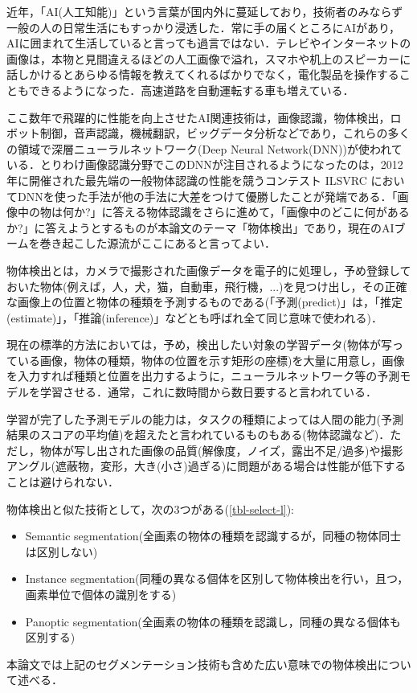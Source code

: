 \documentclass[originalpaper,fleqn]{jsaiart}     %
\begin{document}
近年，「AI(人工知能)」という言葉が国内外に蔓延しており，技術者のみならず一般の人の日常生活にもすっかり浸透した．常に手の届くところにAIがあり，AIに囲まれて生活していると言っても過言ではない．テレビやインターネットの画像は，本物と見間違えるほどの人工画像で溢れ，スマホや机上のスピーカーに話しかけるとあらゆる情報を教えてくれるばかりでなく，電化製品を操作することもできるようになった．高速道路を自動運転する車も増えている．

ここ数年で飛躍的に性能を向上させたAI関連技術は，画像認識，物体検出，ロボット制御，音声認識，機械翻訳，ビッグデータ分析などであり，これらの多くの領域で深層ニューラルネットワーク(Deep Neural Network(DNN))が使われている．とりわけ画像認識分野でこのDNNが注目されるようになったのは，2012年に開催された最先端の一般物体認識の性能を競うコンテスト ILSVRC においてDNNを使った手法が他の手法に大差をつけて優勝したことが発端である．「画像中の物は何か?」に答える物体認識をさらに進めて，「画像中のどこに何があるか?」に答えようとするものが本論文のテーマ「物体検出」であり，現在のAIブームを巻き起こした源流がここにあると言ってよい．

物体検出とは，カメラで撮影された画像データを電子的に処理し，予め登録しておいた物体(例えば，人，犬，猫，自動車，飛行機，...)を見つけ出し，その正確な画像上の位置と物体の種類を予測するものである(「予測(predict)」は，「推定(estimate)」，「推論(inference)」などとも呼ばれ全て同じ意味で使われる)．

現在の標準的方法においては，予め，検出したい対象の学習データ(物体が写っている画像，物体の種類，物体の位置を示す矩形の座標)を大量に用意し，画像を入力すれば種類と位置を出力するように，ニューラルネットワーク等の予測モデルを学習させる．通常，これに数時間から数日要すると言われている．

学習が完了した予測モデルの能力は，タスクの種類によっては人間の能力(予測結果のスコアの平均値)を超えたと言われているものもある(物体認識など)．ただし，物体が写し出された画像の品質(解像度，ノイズ，露出不足/過多)や撮影アングル(遮蔽物，変形，大き(小さ)過ぎる)に問題がある場合は性能が低下することは避けられない．

物体検出と似た技術として，次の3つがある(\ref{tbl-select-l}):

\begin{itemize}
    \item Semantic segmentation(全画素の物体の種類を認識するが，同種の物体同士は区別しない)
    \item Instance segmentation(同種の異なる個体を区別して物体検出を行い，且つ，画素単位で個体の識別をする)
    \item Panoptic segmentation(全画素の物体の種類を認識し，同種の異なる個体も区別する)
\end{itemize}
本論文では上記のセグメンテーション技術も含めた広い意味での物体検出について述べる．
\end{document}
